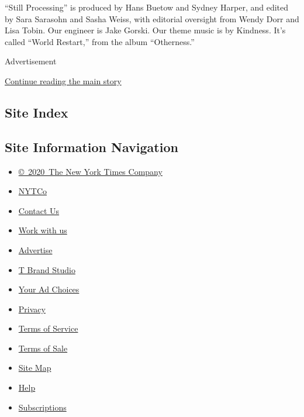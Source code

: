 ``Still Processing'' is produced by Hans Buetow and Sydney Harper, and
edited by Sara Sarasohn and Sasha Weiss, with editorial oversight from
Wendy Dorr and Lisa Tobin. Our engineer is Jake Gorski. Our theme music
is by Kindness. It's called ``World Restart,'' from the album
``Otherness.''

Advertisement

\protect\hyperlink{after-bottom}{Continue reading the main story}

\hypertarget{site-index}{%
\subsection{Site Index}\label{site-index}}

\hypertarget{site-information-navigation}{%
\subsection{Site Information
Navigation}\label{site-information-navigation}}

\begin{itemize}
\tightlist
\item
  \href{https://help.nytimes.com/hc/en-us/articles/115014792127-Copyright-notice}{©~2020~The
  New York Times Company}
\end{itemize}

\begin{itemize}
\tightlist
\item
  \href{https://www.nytco.com/}{NYTCo}
\item
  \href{https://help.nytimes.com/hc/en-us/articles/115015385887-Contact-Us}{Contact
  Us}
\item
  \href{https://www.nytco.com/careers/}{Work with us}
\item
  \href{https://nytmediakit.com/}{Advertise}
\item
  \href{http://www.tbrandstudio.com/}{T Brand Studio}
\item
  \href{https://www.nytimes.com/privacy/cookie-policy\#how-do-i-manage-trackers}{Your
  Ad Choices}
\item
  \href{https://www.nytimes.com/privacy}{Privacy}
\item
  \href{https://help.nytimes.com/hc/en-us/articles/115014893428-Terms-of-service}{Terms
  of Service}
\item
  \href{https://help.nytimes.com/hc/en-us/articles/115014893968-Terms-of-sale}{Terms
  of Sale}
\item
  \href{https://spiderbites.nytimes.com}{Site Map}
\item
  \href{https://help.nytimes.com/hc/en-us}{Help}
\item
  \href{https://www.nytimes.com/subscription?campaignId=37WXW}{Subscriptions}
\end{itemize}

